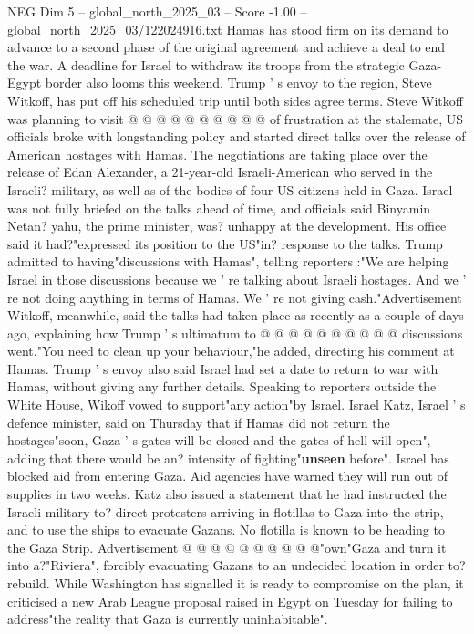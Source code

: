 \begin{textsample}{NEG Dim 5 – global\_north\_2025\_03 – Score -1.00 – global\_north\_2025\_03/122024916.txt}
Hamas has stood firm on its demand to advance to a second phase of the original agreement and achieve a deal to end the war.
A deadline for Israel to withdraw its troops from the strategic Gaza-Egypt border also looms this weekend.
Trump ' s envoy to the region, Steve Witkoff, has put off his scheduled trip until both sides agree terms.
Steve Witkoff was planning to visit @ @ @ @ @ @ @ @ @ @ of frustration at the stalemate, US officials broke with longstanding policy and started direct talks over the release of American hostages with Hamas.
The negotiations are taking place over the release of Edan Alexander, a 21-year-old Israeli-American who served in the Israeli? military, as well as of the bodies of four US citizens held in Gaza.
Israel was not fully briefed on the talks ahead of time, and officials said Binyamin Netan? yahu, the prime minister, was? unhappy at the development.
His office said it had?"expressed its position to the US"in? response to the talks.
Trump admitted to having"discussions with Hamas", telling reporters :"We are helping Israel in those discussions because we ' re talking about Israeli hostages.
And we ' re not doing anything in terms of Hamas.
We ' re not giving cash."Advertisement Witkoff, meanwhile, said the talks had taken place as recently as a couple of days ago, explaining how Trump ' s ultimatum to @ @ @ @ @ @ @ @ @ @ discussions went."You need to clean up your behaviour,"he added, directing his comment at Hamas.
Trump ' s envoy also said Israel had set a date to return to war with Hamas, without giving any further details.
Speaking to reporters outside the White House, Wikoff vowed to support"any action"by Israel.
Israel Katz, Israel ' s defence minister, said on Thursday that if Hamas did not return the hostages"soon, Gaza ' s gates will be closed and the gates of hell will open", adding that there would be an? intensity of fighting"\textbf{unseen} before".
Israel has blocked aid from entering Gaza.
Aid agencies have warned they will run out of supplies in two weeks.
Katz also issued a statement that he had instructed the Israeli military to? direct protesters arriving in flotillas to Gaza into the strip, and to use the ships to evacuate Gazans.
No flotilla is known to be heading to the Gaza Strip.
Advertisement @ @ @ @ @ @ @ @ @ @"own"Gaza and turn it into a?"Riviera", forcibly evacuating Gazans to an undecided location in order to? rebuild.
While Washington has signalled it is ready to compromise on the plan, it criticised a new Arab League proposal raised in Egypt on Tuesday for failing to address"the reality that Gaza is currently uninhabitable".

\end{textsample}

